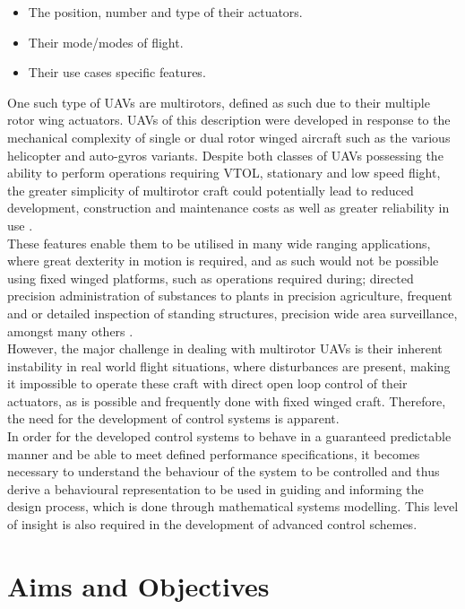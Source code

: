 \documentclass[12pt,a4paper,twoside]{report}
\begin{document}
			\begin{itemize}
				\item
					The position, number and type of their actuators.
				\item 
					Their mode/modes of flight. 
				\item 
					Their use cases specific features.
			\end{itemize}
			\space
			One such type of UAVs are multirotors, defined as such due to their multiple rotor wing actuators. UAVs of this description were developed in response to the mechanical complexity of single or dual rotor winged aircraft such as the various helicopter and auto-gyros variants. Despite both classes of UAVs possessing the ability to perform operations requiring VTOL, stationary and low speed flight, the greater simplicity of multirotor craft could potentially lead to reduced development, construction and maintenance costs as well as greater reliability in use \cite{12}.
			\\
			These features enable them to be utilised in many wide ranging applications, where great dexterity in motion is required, and as such would not be possible using fixed winged platforms, such as operations required during; directed precision administration of substances to plants in precision agriculture, frequent and or detailed inspection of standing structures, precision wide area surveillance, amongst many others \cite{6}.
			\\
			However, the major challenge in dealing with multirotor UAVs is their inherent instability in real world flight situations, where disturbances are present, making it impossible to operate these craft with direct open loop control of their actuators, as is possible and frequently done with fixed winged craft. Therefore, the need for the development of control systems is apparent. 
			\\
			In order for the developed control systems to behave in a guaranteed predictable manner and be able to meet defined performance specifications, it becomes necessary to understand the behaviour of the system to be controlled and thus derive a behavioural representation to be used in guiding and informing the design process, which is done through mathematical systems modelling. This level of insight is also required in the development of advanced control schemes.
		
		\section{Aims and Objectives}
			
\end{document}
